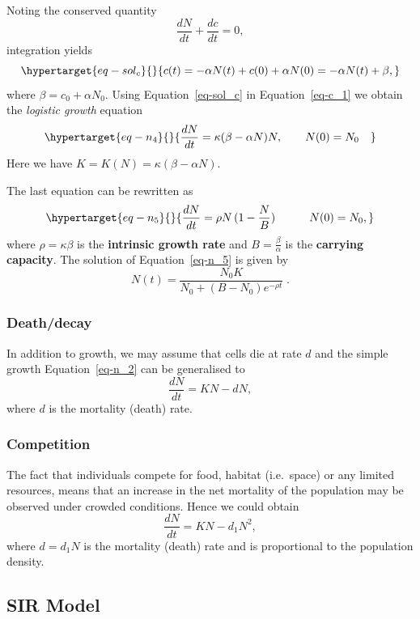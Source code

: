 \documentclass[
  letterpaper,
  DIV=11,
  numbers=noendperiod]{scrreprt}
\theoremstyle{plain}
\theoremstyle{definition}
\theoremstyle{plain}
\theoremstyle{remark}
\begin{document}
Noting the conserved quantity \[
\frac{dN}{dt}+\frac{dc}{dt}=0,
\] integration yields \begin{equation}\protect\hypertarget{eq-sol_c}{}{
c(t)  = - \alpha N(t) + c(0)+ \alpha N(0) = - \alpha N(t) + \beta,
}\label{eq-sol_c}\end{equation} where \(\beta=c_0 +\alpha N_0\). Using
Equation~\ref{eq-sol_c} in Equation~\ref{eq-c_1} we obtain the
\emph{logistic growth} equation
\begin{equation}\protect\hypertarget{eq-n_4}{}{
\frac{dN}{dt} = \kappa ( \beta- \alpha N)  N, \qquad  N(0)= N_0\quad  
}\label{eq-n_4}\end{equation} Here we have
\(K=K(N) = \kappa (\beta - \alpha N)\).

The last equation can be rewritten as
\begin{equation}\protect\hypertarget{eq-n_5}{}{  
\frac{dN}{dt} = \rho  N \,  (1 - \frac N B)  \qquad \quad N(0)= N_0, 
}\label{eq-n_5}\end{equation} where \(\rho = \kappa \beta\) is the
\textbf{intrinsic growth rate} and \(B = \frac \beta \alpha\) is the
\textbf{carrying capacity}. The solution of Equation~\ref{eq-n_5} is
given by \[
N(t)= \frac{ N_0 K} { N_0 + (B-N_0) e^{-\rho t}} \; .
\]

\hypertarget{deathdecay}{%
\subsubsection{Death/decay}\label{deathdecay}}

In addition to growth, we may assume that cells die at rate \(d\) and
the simple growth Equation~\ref{eq-n_2} can be generalised to \[
\frac{dN}{dt} = KN - d N, 
\] where \(d\) is the mortality (death) rate.

\hypertarget{competition}{%
\subsubsection{Competition}\label{competition}}

The fact that individuals compete for food, habitat (i.e.~space) or any
limited resources, means that an increase in the net mortality of the
population may be observed under crowded conditions. Hence we could
obtain \[
\frac{dN}{dt} = KN - d_1 N^2 , 
\] where \(d=d_1N\) is the mortality (death) rate and is proportional to
the population density.

\hypertarget{sir-model}{%
\subsection{SIR Model}\label{sir-model}}
\end{document}
